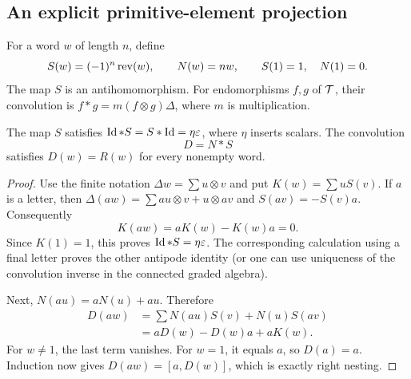 \subsection{An explicit primitive-element projection}
For a word $w$ of length $n$, define
\[
 S(w)=(-1)^n\operatorname{rev}(w),\qquad N(w)=n w,
 \qquad S(1)=1,\quad N(1)=0.
\]
The map $S$ is an antihomomorphism. For endomorphisms $f,g$ of $\mathcal T$, their convolution is
$ f*g=m(f\otimes g)\Delta$, where $m$ is multiplication.

\begin{lemma}\label{lem:dynkin-operator}
The map $S$ satisfies $\operatorname{Id}*S=S*\operatorname{Id}=\eta\varepsilon$, where $\eta$ inserts scalars. The convolution
\begin{equation}\label{eq:dynkin-operator}
 D=N*S
\end{equation}
satisfies $D(w)=R(w)$ for every nonempty word.
\end{lemma}
\begin{proof}
Use the finite notation $\Delta w=\sum u\otimes v$ and put
$K(w)=\sum uS(v)$. If $a$ is a letter, then
$\Delta(aw)=\sum au\otimes v+u\otimes av$ and $S(av)=-S(v)a$.
Consequently
\[
 K(aw)=aK(w)-K(w)a=0.
\]
Since $K(1)=1$, this proves $\operatorname{Id}*S=\eta\varepsilon$. The corresponding calculation using a final letter proves the other antipode identity (or one can use uniqueness of the convolution inverse in the connected graded algebra).

Next, $N(au)=aN(u)+au$. Therefore
\begin{align*}
 D(aw)
 &=\sum N(au)S(v)+N(u)S(av)\\
 &=aD(w)-D(w)a+aK(w).
\end{align*}
For $w\ne1$, the last term vanishes. For $w=1$, it equals $a$, so $D(a)=a$. Induction now gives $D(aw)=[a,D(w)]$, which is exactly right nesting.
\end{proof}


